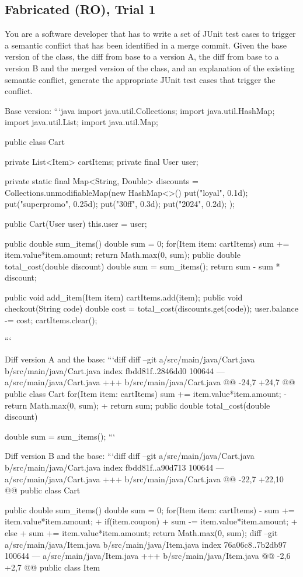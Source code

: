 \subsection{Fabricated (RO), Trial 1}

\begin{prompt}
You are a software developer that has to write a set of JUnit test cases to trigger a semantic conflict that has been identified in a merge commit. 
Given the base version of the class, the diff from base to a version A, the diff from base to a version B and the merged version of the class, and an explanation of the existing semantic conflict, generate the appropriate JUnit test cases that trigger the conflict.

Base version:
```java
import java.util.Collections;
import java.util.HashMap;
import java.util.List;
import java.util.Map;

public class Cart {
    private List<Item> cartItems;
    private final User user;

    private static final Map<String, Double> discounts = Collections.unmodifiableMap(new HashMap<>() {{
        put("loyal", 0.1d);
        put("superpromo", 0.25d);
        put("30ff", 0.3d);
        put("2024", 0.2d);
    }});


    public Cart(User user) {
        this.user = user;
    }

    public double sum_items() {
        double sum = 0;
        for(Item item: cartItems) {
            sum += item.value*item.amount;
        }
        return Math.max(0, sum);
    }
    public double total_cost(double discount) {
        double sum = sum_items();
        return sum - sum * discount;
    }

    public void add_item(Item item) {
        cartItems.add(item);
    }
    public void checkout(String code) {
        double cost = total_cost(discounts.get(code));
        user.balance -= cost;
        cartItems.clear();
    }
}
```

Diff version A and the base:
```diff
diff --git a/src/main/java/Cart.java b/src/main/java/Cart.java
index fbdd81f..2846dd0 100644
--- a/src/main/java/Cart.java
+++ b/src/main/java/Cart.java
@@ -24,7 +24,7 @@ public class Cart {
          for(Item item: cartItems) {
              sum += item.value*item.amount;
          }
-        return Math.max(0, sum);
+        return sum;
      }
      public double total_cost(double discount) {
          double sum = sum_items();
```

Diff version B and the base:
```diff
diff --git a/src/main/java/Cart.java b/src/main/java/Cart.java
index fbdd81f..a90d713 100644
--- a/src/main/java/Cart.java
+++ b/src/main/java/Cart.java
@@ -22,7 +22,10 @@ public class Cart {
      public double sum_items() {
          double sum = 0;
          for(Item item: cartItems) {
-            sum += item.value*item.amount;
+            if(item.coupon)
+                sum -= item.value*item.amount;
+            else
+                sum += item.value*item.amount;
          }
          return Math.max(0, sum);
      }
diff --git a/src/main/java/Item.java b/src/main/java/Item.java
index 76a06c8..7b2db97 100644
--- a/src/main/java/Item.java
+++ b/src/main/java/Item.java
@@ -2,6 +2,7 @@ public class Item {

}}}
\end{prompt}
